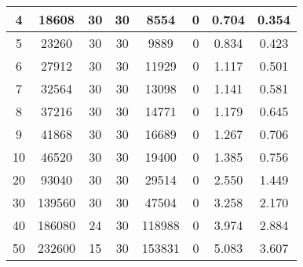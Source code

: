 \documentclass{acmsiggraph}
\begin{document}
\begin{table}[h]
\begin{tabular}{|c|c|c|c|c|c|c|c|}
    \hline                                                                             
                    4  & 18608                  & 30 & 30                  & 8554  & 0                                     & 0.704 & 0.354                              \\   
    \hline                                                                             
                    5  & 23260                  & 30 & 30                  & 9889  & 0                                     & 0.834 & 0.423                              \\   
    \hline                                                                             
                    6  & 27912                  & 30 & 30                  & 11929 & 0                                     & 1.117 & 0.501                              \\   
    \hline                      
                    7  & 32564                  & 30 & 30                  & 13098 & 0                                     & 1.141 & 0.581                              \\   
    \hline                      
                    8  & 37216                  & 30 & 30                  & 14771 & 0                                     & 1.179 & 0.645                              \\   
    \hline                      
                    9  & 41868                  & 30 & 30                  & 16689 & 0                                     & 1.267 & 0.706                              \\   
    \hline                      
                    10 & 46520                  & 30 & 30                  & 19400 & 0                                     & 1.385 & 0.756                              \\   
    \hline
                    20 & 93040                  & 30 & 30                  & 29514 & 0                                     & 2.550 & 1.449                              \\   
    \hline
                    30 & 139560                 & 30 & 30                  & 47504 & 0                                     & 3.258 & 2.170                              \\   
    \hline
                    40 & 186080                 & 24 & 30                  & 118988& 0                                     & 3.974 & 2.884                              \\   
    \hline
                    50 & 232600                 & 15 & 30                  & 153831& 0                                     & 5.083 & 3.607                              \\   

\end{tabular}
\end{table}
\end{document}
